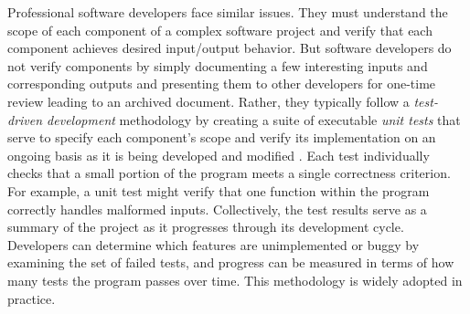 \documentclass{frontiersSCNS}
\begin{document}





Professional software developers face similar issues. 
They must understand the scope of each component of a complex software project and verify that each component achieves desired input/output behavior. 
But software developers do not verify components by simply documenting a few interesting inputs and corresponding outputs and presenting them to other developers for one-time review leading to an archived document. 
Rather, they typically follow a \emph{test-driven development} methodology by creating a suite of executable \emph{unit tests} that serve to specify each component's scope and verify its implementation on an ongoing basis as it is being developed and modified \citep{beck2003}. 
Each test individually checks that a small portion of the program meets a single correctness criterion. For example, a unit test might verify that one function within the program correctly handles malformed inputs. 
Collectively, the test results serve as a summary of the project as it progresses through its development cycle. 
Developers can determine which features are unimplemented or buggy by examining the set of failed tests, and progress can be measured in terms of how many tests the program passes over time. 
This methodology is widely adopted in practice.

\end{document}
